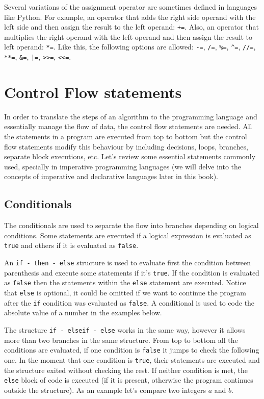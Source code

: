 Several variations of the assignment operator are sometimes defined in languages like Python. 
For example, 
an operator that adds the right side operand with the left side and then assign the result to the left operand: \texttt{+=}.
Also, an operator that multiplies the right operand with the left operand and then assign the result to left operand: \texttt{*=}.
Like this, the following options are allowed: \texttt{-=}, \texttt{/=}, \texttt{\%=}, \texttt{\^{}=}, \texttt{//=}, \texttt{**=}, \texttt{\&=}, \texttt{|=}, \texttt{>>=}, \texttt{<<=}. 






    \newpage
    \section{Control Flow statements}
In order to translate the steps of an algorithm to the programming language 
and essentially manage the flow of data, the control flow statements are needed. 
All the statements in a program are executed from top to bottom but 
the control flow statements modify this behaviour by including decisions, 
loops, branches, separate block executions, etc.
Let's review some essential statements commonly used, 
specially in imperative programming languages 
(we will delve into the concepts of imperative and declarative languages later in this book).


        \subsection{Conditionals}
        \vspace{-0.3cm}
The conditionals are used to separate the flow into branches depending on logical conditions. 
Some statements are executed if a logical expression is evaluated as \texttt{true} and others if it is evaluated as \texttt{false}.

An \texttt{if - then - else} structure is used to evaluate first the condition between parenthesis and execute some statements if it's \texttt{true}.
If the condition is evaluated as \texttt{false} then the statements within the \texttt{else} statement are executed. 
Notice that \texttt{else} is optional, it could be omitted if we want to continue the program after the \texttt{if} condition was evaluated as \texttt{false}. 
A conditional is used to code the absolute value of a number in the examples below. 

The structure \texttt{if - elseif - else} works in the same way, however it allows more than two branches in the same structure. 
From top to bottom all the conditions are evaluated, if one condition is \texttt{false} it jumps to check the following one. 
In the moment that one condition is \texttt{true}, their statements are executed and the structure exited without checking the rest. 
If neither condition is met, the \texttt{else} block of code is executed (if it is present, otherwise the program continues outside the structure).
As an example let's compare two integers $a$ and $b$. 

